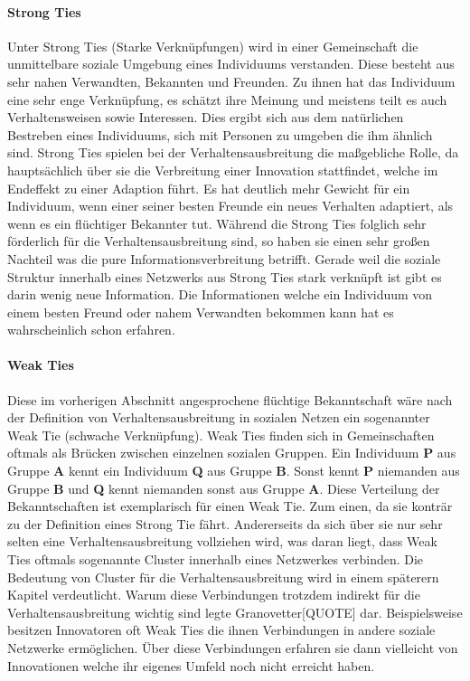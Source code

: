 \documentclass[12pt]{article}
\begin{document}
\paragraph{Strong Ties}
Unter Strong Ties (Starke Verknüpfungen) wird in einer Gemeinschaft die unmittelbare soziale Umgebung eines Individuums verstanden. Diese besteht aus sehr nahen Verwandten, Bekannten und Freunden. Zu ihnen hat das Individuum eine sehr enge Verknüpfung, es schätzt ihre Meinung und meistens teilt es auch Verhaltensweisen sowie Interessen. Dies ergibt sich aus dem natürlichen Bestreben eines Individuums, sich mit Personen zu umgeben die ihm ähnlich sind. Strong Ties spielen bei der Verhaltensausbreitung die maßgebliche Rolle, da hauptsächlich über sie die Verbreitung einer Innovation stattfindet, welche im Endeffekt zu einer Adaption führt. Es hat deutlich mehr Gewicht für ein Individuum, wenn einer seiner besten Freunde ein neues Verhalten adaptiert, als wenn es ein flüchtiger Bekannter tut. Während die Strong Ties folglich sehr förderlich für die Verhaltensausbreitung sind, so haben sie einen sehr großen Nachteil was die pure Informationsverbreitung betrifft. Gerade weil die soziale Struktur innerhalb eines Netzwerks aus Strong Ties stark verknüpft ist gibt es darin wenig neue Information. Die Informationen welche ein Individuum von einem besten Freund oder nahem Verwandten bekommen kann hat es wahrscheinlich schon erfahren.
\paragraph{Weak Ties}
Diese im vorherigen Abschnitt angesprochene flüchtige Bekanntschaft wäre nach der Definition von Verhaltensausbreitung in sozialen Netzen ein sogenannter Weak Tie (schwache Verknüpfung). Weak Ties finden sich in Gemeinschaften oftmals als Brücken zwischen einzelnen sozialen Gruppen. Ein Individuum \textbf{P} aus Gruppe \textbf{A} kennt ein Individuum \textbf{Q} aus Gruppe \textbf{B}. Sonst kennt \textbf{P} niemanden aus Gruppe \textbf{B} und \textbf{Q} kennt niemanden sonst aus Gruppe \textbf{A}. Diese Verteilung der Bekanntschaften ist exemplarisch für einen Weak Tie. Zum einen, da sie konträr zu der Definition eines Strong Tie fährt. Andererseits da sich über sie nur sehr selten eine Verhaltensausbreitung vollziehen wird, was daran liegt, dass Weak Ties oftmals sogenannte Cluster innerhalb eines Netzwerkes verbinden. Die Bedeutung von Cluster für die Verhaltensausbreitung wird in einem späterern Kapitel verdeutlicht. Warum diese Verbindungen trotzdem indirekt für die Verhaltensausbreitung wichtig sind legte Granovetter[QUOTE] dar. Beispielsweise besitzen Innovatoren oft Weak Ties die ihnen Verbindungen in andere soziale Netzwerke ermöglichen. Über diese Verbindungen erfahren sie dann vielleicht von Innovationen welche ihr eigenes Umfeld noch nicht erreicht haben.
\end{document}
